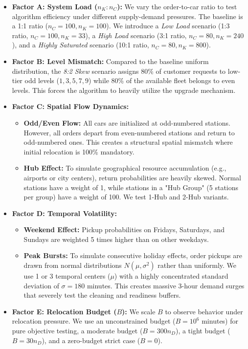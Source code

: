 \documentclass[10pt,a4paper]{article}
\begin{document}
\begin{itemize}[itemsep=2pt, parsep=0pt, topsep=4pt]
    \item \textbf{Factor A: System Load ($n_K:n_C$):} We vary the order-to-car ratio to test algorithm efficiency under different supply-demand pressures. The baseline is a 1:1 ratio ($n_C=100, n_K=100$). We introduce a \textit{Low Load} scenario (1:3 ratio, $n_C=100, n_K=33$), a \textit{High Load} scenario (3:1 ratio, $n_C=80, n_K=240$), and a \textit{Highly Saturated} scenario (10:1 ratio, $n_C=80, n_K=800$).    
    \item \textbf{Factor B: Level Mismatch:} Compared to the baseline uniform distribution, the \textit{8:2 Skew} scenario assigns 80\% of customer requests to low-tier odd levels ($1,3,5,7,9$) while 80\% of the available fleet belongs to even levels. This forces the algorithm to heavily utilize the upgrade mechanism.
    
    \item \textbf{Factor C: Spatial Flow Dynamics:} 
    \begin{itemize}[itemsep=2pt, parsep=0pt, topsep=2pt]
        \item \textbf{Odd/Even Flow:} All cars are initialized at odd-numbered stations. However, all orders depart from even-numbered stations and return to odd-numbered ones. This creates a structural spatial mismatch where initial relocation is 100\% mandatory.
        \item \textbf{Hub Effect:} To simulate geographical resource accumulation (e.g., airports or city centers), return probabilities are heavily skewed. Normal stations have a weight of 1, while stations in a "Hub Group" (5 stations per group) have a weight of 100. We test 1-Hub and 2-Hub variants.
    \end{itemize}
    
    \item \textbf{Factor D: Temporal Volatility:} 
    \begin{itemize}[itemsep=2pt, parsep=0pt, topsep=2pt]
        \item \textbf{Weekend Effect:} Pickup probabilities on Fridays, Saturdays, and Sundays are weighted 5 times higher than on other weekdays.
        \item \textbf{Peak Bursts:} To simulate consecutive holiday effects, order pickups are drawn from normal distributions $N(\mu, \sigma^2)$ rather than uniformly. We use 1 or 3 temporal centers ($\mu$) with a highly concentrated standard deviation of $\sigma = 180$ minutes. This creates massive 3-hour demand surges that severely test the cleaning and readiness buffers.
    \end{itemize}
    
    \item \textbf{Factor E: Relocation Budget ($B$):} We scale $B$ to observe behavior under relocation pressure. We use an unconstrained budget ($B=10^6$ minutes) for pure objective testing, a moderate budget ($B=300 n_D$), a tight budget ($B=30 n_D$), and a zero-budget strict case ($B=0$).
\end{itemize}
\end{document}
